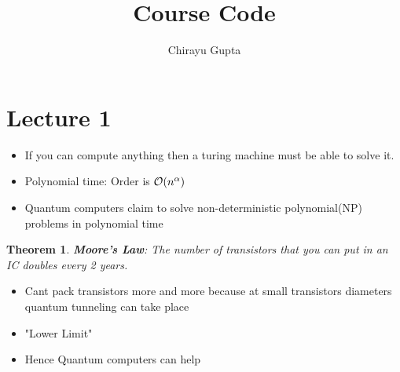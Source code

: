 \documentclass{scrartcl}
\title{  \\ \large{ Course Code } }
\author{Chirayu Gupta}
\date{}
\newtheorem{theorem}{Theorem}
\begin{document}
\section{Lecture 1}
\begin{itemize}
	\item If you can compute anything then a turing machine must be able to solve it.
	\item Polynomial time: Order is \( \order{n^\alpha} \)
	\item Quantum computers claim to solve non-deterministic polynomial(NP) problems in polynomial time
\end{itemize}
\begin{theorem}
	\textbf{Moore's Law}: The number of transistors that you can put in an IC doubles every 2 years.
\end{theorem}
\begin{itemize}
	\item Cant pack transistors more and more because at small transistors diameters quantum tunneling can take place
	\item "Lower Limit"
	\item Hence Quantum computers can help
\end{itemize}
\end{document}
